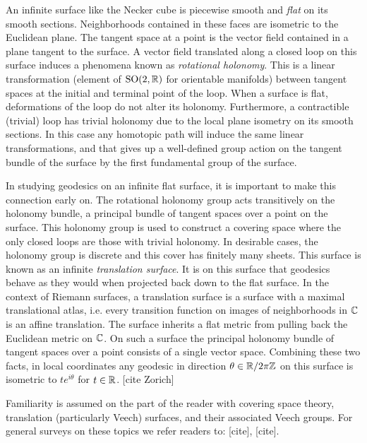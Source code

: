 \documentclass[a4paper, 11pt]{article}
\def\SO{\mathrm{SO}}
\begin{document}
An infinite surface like the Necker cube is piecewise smooth and \emph{flat} on its smooth sections. Neighborhoods contained in these faces are isometric to the Euclidean plane. The tangent space at a point is the vector field contained in a plane tangent to the surface. A vector field translated along a closed loop on this surface induces a phenomena known as \emph{rotational holonomy}. This is a linear transformation (element of $\SO(2,\RR)$ for orientable manifolds) between tangent spaces at the initial and terminal point of the loop. When a surface is flat, deformations of the loop do not alter its holonomy. Furthermore, a contractible (trivial) loop has trivial holonomy due to the local plane isometry on its smooth sections. In this case any homotopic path will induce the same linear transformations, and that gives up a well-defined group action on the tangent bundle of the surface by the first fundamental group of the surface.

In studying geodesics on an infinite flat surface, it is important to make this connection early on. The rotational holonomy group acts transitively on the holonomy bundle, a principal bundle of tangent spaces over a point on the surface. This holonomy group is used to construct a covering space where the only closed loops are those with trivial holonomy. In desirable cases, the holonomy group is discrete and this cover has finitely many sheets. This surface is known as an infinite \emph{translation surface}. It is on this surface that geodesics behave as they would when projected back down to the flat surface. In the context of Riemann surfaces, a translation surface is a surface with a maximal translational atlas, i.e. every transition function on images of neighborhoods in $\mathbb{C}$ is an affine translation. The surface inherits a flat metric from pulling back the Euclidean metric on $\mathbb{C}$. On such a surface the principal holonomy bundle of tangent spaces over a point consists of a single vector space. Combining these two facts, in local coordinates any geodesic in direction $\theta\in\mathbb{R}/2\pi\mathbb{Z}$ on this surface is isometric to $te^{i\theta}$ for $t\in\mathbb{R}$. [cite Zorich]
\begin{rem}
Familiarity is assumed on the part of the reader with covering space theory, translation (particularly Veech) surfaces, and their associated Veech groups. For general surveys on these topics we refer readers to: [cite], [cite].
\end{rem}
\end{document}
